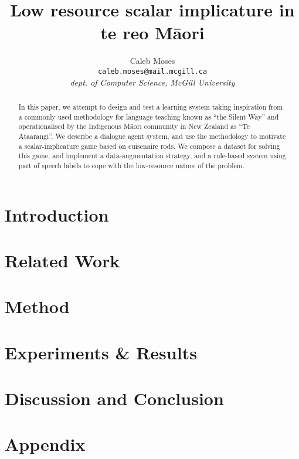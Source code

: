 \documentclass[11pt]{article}
\title{Low resource scalar implicature in te reo Māori}
\author{Caleb Moses\\
  \texttt{caleb.moses@mail.mcgill.ca} \\
  \textit{dept. of Computer Science, McGill University}
}
\begin{document}
\pagestyle{plain}
\thispagestyle{plain}

\maketitle
\begin{abstract}
In this paper, we attempt to design and test a learning system taking inspiration from a commonly used methodology for language teaching known as ``the Silent Way'' and operationalised by the Indigenous Māori community in New Zealand as ``Te Ataarangi''. We describe a dialogue agent system, and use the methodology to motivate a scalar-implicature game based on cuisenaire rods. We compose a dataset for solving this game, and implement a data-augmentation strategy, and a rule-based system using part of speech labels to cope with the low-resource nature of the problem.
\end{abstract}


\section{Introduction}


\section{Related Work}


\section{Method}


\section{Experiments \& Results}


\section{Discussion and Conclusion}


% 




\appendix

\section{Appendix}



\end{document}
